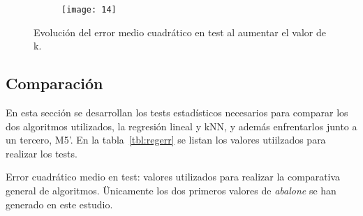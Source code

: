 \documentclass[a4paper, 11pt]{article}
\begin{document}
\begin{figure}[ht]
  \centering
  \begin{subfigure}{.48\textwidth}
  \texttt{[image: 14]}
  \end{subfigure}
  \hfill
  \begin{subfigure}{.48\textwidth}
    \centering
  \end{subfigure}
  
  \caption{\label{fig:knnreg}Evolución del error medio cuadrático en test al aumentar el valor de k.}
\end{figure}

\subsection{Comparación}

En esta sección se desarrollan los tests estadísticos necesarios para comparar los dos algoritmos utilizados, la regresión lineal y kNN, y además enfrentarlos junto a un tercero, M5'. En la tabla~\ref{tbl:regerr} se listan los valores utiilzados para realizar los tests.

\begin{table}[ht]
  \caption{\label{tbl:regerr}Error cuadrático medio en test: valores utilizados para realizar la comparativa general de algoritmos. Ünicamente los dos primeros valores de \textit{abalone} se han generado en este estudio.}
  
\end{table}
\end{document}
